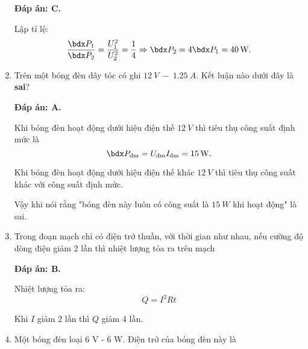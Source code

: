 \begin{enumerate}[label=\bfseries Câu \arabic*:]
{	}
	\loigiai
	{	\textbf{Đáp án: C.}
		
		Lập tỉ lệ:
		$$\dfrac{\calP_1}{\calP_2} = \dfrac{U_1^2}{U_2^2}=\dfrac{1}{4} \Rightarrow \calP_2 = 4\calP_1 = \SI{40}{W}.$$
	}
	\item {}
	
	\cauhoi
	{Trên một bóng đèn dây tóc có ghi $\SI{12}{V}\ -\ \SI{1.25}{A}$. Kết luận nào dưới đây là \textbf{sai}?
		
	}
	\loigiai
	{	\textbf{Đáp án: A.}
		
		Khi bóng đèn hoạt động dưới hiệu điện thế $\SI{12}{V}$ thì tiêu thụ công suất định mức là
		$$\calP_\text{đm} = U_\text{đm} I_\text{đm} = \SI{15}{W}.$$
		
		Khi bóng đèn hoạt động dưới hiệu điện thế khác $\SI{12}{V}$ thì tiêu thụ công suất khác với công suất định mức.
		
		Vậy khi nói rằng "bóng đèn này luôn có công suất là $\SI{15}{W}$ khi hoạt động" là sai. 
	}
	\item {}
	
	\cauhoi
	{Trong đoạn mạch chỉ có điện trở thuần, với thời gian như nhau, nếu cường độ dòng điện giảm 2 lần thì nhiệt lượng tỏa ra trên mạch
		
	}
	\loigiai
	{	\textbf{Đáp án: B.}
		
		Nhiệt lượng tỏa ra:
		$$Q=I^2 Rt$$
		
		Khi $I$ giảm 2 lần thì $Q$ giảm 4 lần.
	}
	\item {}
	
	\cauhoi
	{Một bóng đèn loại 6 V - 6 W. Điện trở của bóng đèn này là
		
}
\end{enumerate}
